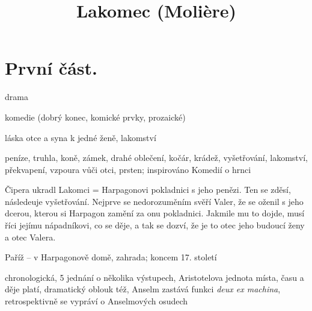\documentclass{article}
\title{\vspace{-2cm}Lakomec (Molière)\vspace{-2cm}}
\date{}
\author{}
\begin{document}
\maketitle
\section{První část.}
\begin{description}
    \setlength\itemsep{0.15em}
    \item[druh:] drama
    \item[žánr:] komedie (dobrý konec, komické prvky, prozaické)
    \item[téma:] láska otce a syna k jedné ženě, lakomství
    \item[motivy:] peníze, truhla, koně, zámek, drahé oblečení, kočár, krádež, vyšetřování, lakomství, překvapení, vzpoura vůči otci, prsten; inspirováno Komedií o hrnci
    \item[zařazení výňatku do kontextu díla:] Čipera ukradl Lakomci = Harpagonovi pokladnici s jeho penězi. Ten se zděsí, následeuje vyšetřování. Nejprve se nedorozuměním svěří Valer, že se oženil s jeho dcerou, kterou si Harpagon zamění za onu pokladnici. Jakmile mu to dojde, musí říci jejímu nápadníkovi, co se děje, a tak se dozví, že je to otec jeho budoucí ženy a otec Valera.
    \item[časoprostor:] Paříž -- v Harpagonově domě, zahrada; koncem 17. století
    \item[kompoziční výstavba:] chronologická, 5 jednání o několika výstupech, Aristotelova jednota místa, času a děje platí, dramatický oblouk též, Anselm zastává funkci \textit{deux ex machina}, retrospektivně se vypráví o Anselmových osudech
\end{description}
\end{document}
